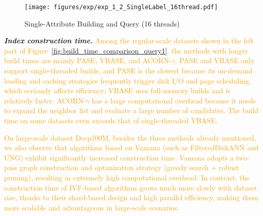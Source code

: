 \documentclass[sigconf, nonacm]{acmart}
\begin{document}
	\begin{figure}
		\centering
		
		\texttt{[image: figures/exp/exp\_1\_2\_SingleLabel\_16thread.pdf]}
		\caption{Single-Attribute Building and Query (16 threads)}
		\label{fig:exp_1_2_SingleLabel_16thread}
	\end{figure}
	
\textit{\textbf{Index construction time.}}
\textcolor{orange}{Among the regular-scale datasets shown in the left part of Figure~\ref{fig:build_time_comparison_query1}, the methods with longer build times are mainly PASE, VBASE, and ACORN-$\gamma$. PASE and VBASE only support single-threaded builds, and PASE is the slowest because its on-demand loading and caching strategies frequently trigger disk I/O and page scheduling, which seriously affects efficiency; VBASE uses full-memory builds and is relatively faster. ACORN-$\gamma$  has a large computational overhead because it needs to expand the neighbor list and evaluate a large number of candidates. The build time on some datasets even exceeds that of single-threaded VBASE. }

\textcolor{orange}{On large-scale dataset Deep100M, besides the three methods already mentioned, we also observe that algorithms based on Vamana (such as FilteredDiskANN and UNG) exhibit significantly increased construction time. Vamana adopts a two-pass graph construction and optimization strategy (greedy search + robust pruning), resulting in extremely high computational overhead. 
In contrast, the construction time of IVF-based algorithms grows much more slowly with dataset size, thanks to their shard-based design and high parallel efficiency, making them more scalable and advantageous in large-scale scenarios.}


%
%
%
\end{document}
